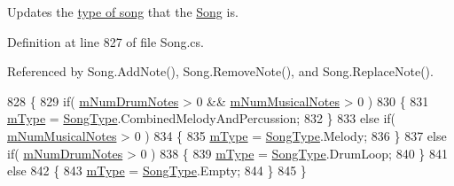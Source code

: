 Updates the \hyperlink{group___song_enums_gae681a1f001333e39fc1cb4fea97bfe1b}{type of song} that the \hyperlink{class_song}{Song} is. 



Definition at line 827 of file Song.\+cs.



Referenced by Song.\+Add\+Note(), Song.\+Remove\+Note(), and Song.\+Replace\+Note().


\begin{DoxyCode}
828     \{
829         \textcolor{keywordflow}{if}( \hyperlink{group___song_priv_var_ga3dbce17d96b434d4492280c39cff1778}{mNumDrumNotes} > 0 && \hyperlink{group___song_priv_var_gaf55b4fd2df0457ba1306a75ac3fdc8b1}{mNumMusicalNotes} > 0 )
830         \{
831             \hyperlink{group___song_priv_var_gaf3b9d0f461522324f897b746311b43c5}{mType} = \hyperlink{group___song_enums_gae681a1f001333e39fc1cb4fea97bfe1b}{SongType}.CombinedMelodyAndPercussion;
832         \}
833         \textcolor{keywordflow}{else} \textcolor{keywordflow}{if}( \hyperlink{group___song_priv_var_gaf55b4fd2df0457ba1306a75ac3fdc8b1}{mNumMusicalNotes} > 0 )
834         \{
835             \hyperlink{group___song_priv_var_gaf3b9d0f461522324f897b746311b43c5}{mType} = \hyperlink{group___song_enums_gae681a1f001333e39fc1cb4fea97bfe1b}{SongType}.Melody;
836         \}
837         \textcolor{keywordflow}{else} \textcolor{keywordflow}{if}( \hyperlink{group___song_priv_var_ga3dbce17d96b434d4492280c39cff1778}{mNumDrumNotes} > 0 )
838         \{
839             \hyperlink{group___song_priv_var_gaf3b9d0f461522324f897b746311b43c5}{mType} = \hyperlink{group___song_enums_gae681a1f001333e39fc1cb4fea97bfe1b}{SongType}.DrumLoop;
840         \}
841         \textcolor{keywordflow}{else}
842         \{
843             \hyperlink{group___song_priv_var_gaf3b9d0f461522324f897b746311b43c5}{mType} = \hyperlink{group___song_enums_gae681a1f001333e39fc1cb4fea97bfe1b}{SongType}.Empty;
844         \}
845     \}
\end{DoxyCode}
